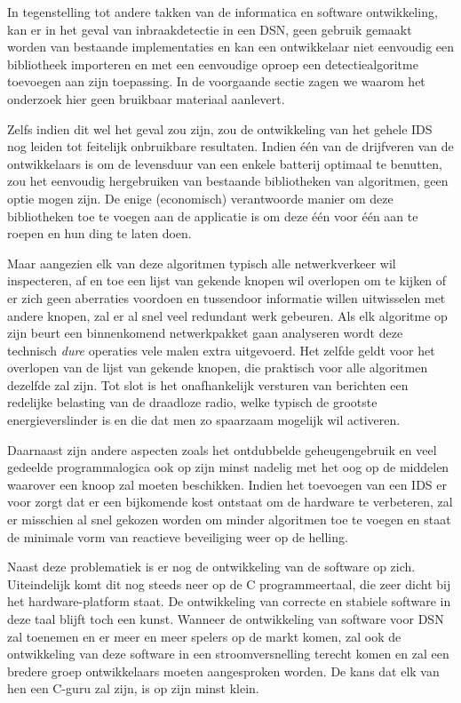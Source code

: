 In tegenstelling tot andere takken van de informatica en software ontwikkeling,
kan er in het geval van inbraakdetectie in een DSN, geen gebruik gemaakt worden
van bestaande implementaties en kan een ontwikkelaar niet eenvoudig een
bibliotheek importeren en met een eenvoudige oproep een detectiealgoritme
toevoegen aan zijn toepassing. In de voorgaande sectie zagen we waarom het
onderzoek hier geen bruikbaar materiaal aanlevert.

Zelfs indien dit wel het geval zou zijn, zou de ontwikkeling van het gehele IDS
nog leiden tot feitelijk onbruikbare resultaten. Indien \'e\'en van de
drijfveren van de ontwikkelaars is om de levensduur van een enkele batterij
optimaal te benutten, zou het eenvoudig hergebruiken van bestaande bibliotheken
van algoritmen, geen optie mogen zijn. De enige (economisch) verantwoorde
manier om deze bibliotheken toe te voegen aan de applicatie is om deze \'e\'en
voor \'e\'en aan te roepen en hun ding te laten doen.

Maar aangezien elk van deze algoritmen typisch alle netwerkverkeer wil
inspecteren, af en toe een lijst van gekende knopen wil overlopen om te kijken
of er zich geen aberraties voordoen en tussendoor informatie willen uitwisselen
met andere knopen, zal er al snel veel redundant werk gebeuren. Als elk
algoritme op zijn beurt een binnenkomend netwerkpakket gaan analyseren wordt
deze technisch \emph{dure} operaties vele malen extra uitgevoerd. Het zelfde
geldt voor het overlopen van de lijst van gekende knopen, die praktisch voor
alle algoritmen dezelfde zal zijn. Tot slot is het onafhankelijk versturen van
berichten een redelijke belasting van de draadloze radio, welke typisch de
grootste energieverslinder is en die dat men zo spaarzaam mogelijk wil
activeren.

Daarnaast zijn andere aspecten zoals het ontdubbelde geheugengebruik en veel
gedeelde programmalogica ook op zijn minst nadelig met het oog op de middelen
waarover een knoop zal moeten beschikken. Indien het toevoegen van een IDS er
voor zorgt dat er een bijkomende kost ontstaat om de hardware te verbeteren,
zal er misschien al snel gekozen worden om minder algoritmen toe te voegen en
staat de minimale vorm van reactieve beveiliging weer op de helling.

Naast deze problematiek is er nog de ontwikkeling van de software op zich.
Uiteindelijk komt dit nog steeds neer op de C programmeertaal, die zeer dicht
bij het hardware-platform staat. De ontwikkeling van correcte en stabiele
software in deze taal blijft toch een kunst. Wanneer de ontwikkeling van
software voor DSN zal toenemen en er meer en meer spelers op de markt komen,
zal ook de ontwikkeling van deze software in een stroomversnelling terecht
komen en zal een bredere groep ontwikkelaars moeten aangesproken worden. De
kans dat elk van hen een C-guru zal zijn, is op zijn minst klein.

